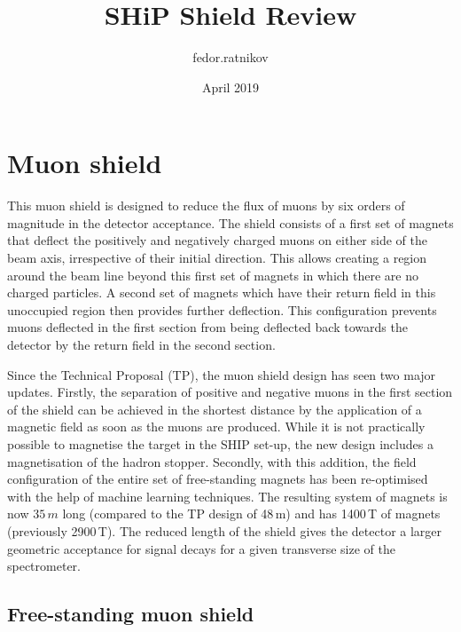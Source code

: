 \documentclass{article}
\title{SHiP Shield Review}
\author{fedor.ratnikov }
\date{April 2019}
\begin{document}
\maketitle


\section{Muon shield}

This muon shield is designed to reduce the flux of muons by six orders of magnitude 
in the detector acceptance. The shield consists of a first set of magnets that deflect the 
positively and negatively 
charged muons on either side of the beam axis, irrespective of their initial 
direction. This allows creating a region around the beam line beyond this first set of 
magnets in which there are no charged particles. A second set of magnets which have 
their return field in this unoccupied region then provides further deflection. This 
configuration prevents muons deflected in the first section from being deflected back 
towards the detector by the return field in the second section.  

Since the Technical Proposal (TP), the muon shield design has seen two major updates.
Firstly, the separation of positive and negative muons in the first section of the shield 
can be achieved in the shortest distance by the application of a magnetic field as 
soon as the muons are produced. While it is not practically possible to magnetise 
the target in the SHIP set-up, the new design includes a magnetisation of the hadron
stopper. Secondly, with this addition, the field configuration of the entire set of 
free-standing magnets has been re-optimised with the help of machine learning techniques.
The resulting system of magnets is now $35\,m$ long (compared to the TP design of 48\,m) 
and has 1400\,T of magnets (previously 2900\,T). 
The reduced length of the shield gives the detector a larger geometric acceptance for 
signal decays for a given transverse size of the spectrometer. 

\subsection{Free-standing muon shield}
\end{document}
